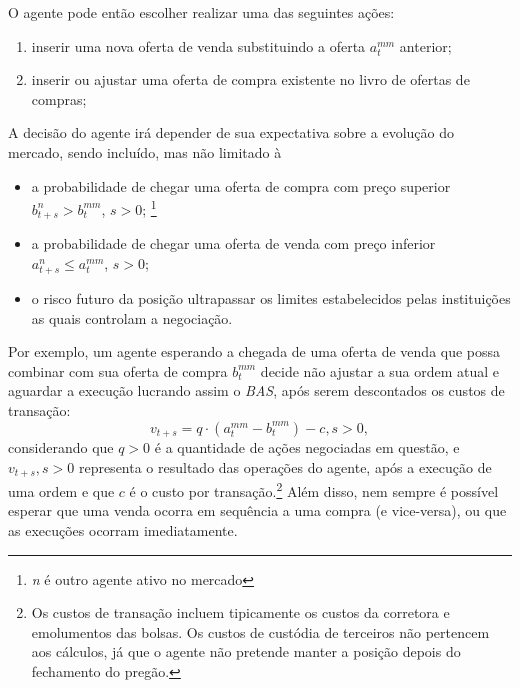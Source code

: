 O agente pode então escolher realizar uma das seguintes ações:
\begin{enumerate}
    \item inserir uma nova oferta de venda substituindo a oferta $a_t^{mm}$ anterior;
    \item inserir ou ajustar uma oferta de compra existente no livro de ofertas de compras;
\end{enumerate}

A decisão do agente irá depender de sua expectativa sobre a evolução do mercado, sendo incluído, mas não limitado à
\begin{itemize}
    \item a probabilidade de chegar uma oferta de compra com preço superior $b_{t + s}^{n} > b_{t}^{mm}$, $s > 0$; \footnote{\label{agent}\textit{n} é outro agente ativo no mercado}
    \item a probabilidade de chegar uma oferta de venda com preço inferior $a_{t + s}^{n} \leq a_{t}^{mm}$, $s > 0$; 
    \item o risco futuro da posição ultrapassar os limites estabelecidos pelas instituições as quais controlam a negociação.
\end{itemize}

Por exemplo, um agente esperando a chegada de uma oferta de venda que possa combinar com sua oferta de compra $b_{t}^{mm}$ decide não ajustar a sua ordem atual e aguardar a execução lucrando assim o \textit{BAS}, após serem descontados os custos de transação:
\begin{equation*}
    v_{t + s} = q \cdot \left(a_t^{mm} - b_t^{mm}\right) - c, s > 0,
\end{equation*}
considerando que $q > 0$ é a quantidade de ações negociadas em questão, e $v_{t + s}, s > 0$ representa o resultado das operações do agente, após a execução de uma ordem e que $c$ é o custo por transação.\footnote{Os custos de transação incluem tipicamente os custos da corretora e emolumentos das bolsas. Os custos de custódia de terceiros não pertencem aos cálculos, já que o agente não pretende manter a posição depois do fechamento do pregão.} Além disso, nem sempre é possível esperar que uma venda ocorra em sequência a uma compra (e vice-versa), ou que as execuções ocorram imediatamente.

